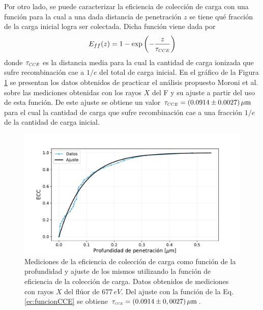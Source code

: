 Por otro lado, se puede caracterizar la eficiencia de colección de carga con una función para la cual a una dada distancia de penetración $z$ se tiene qué fracción de la carga inicial logra ser colectada. Dicha función viene dada por
\begin{equation}
    E_{ff}(z) = 1 - 
    \exp
    \left(
        -\frac{z}{\tau_{\scaleto{CCE}{4pt}}}
    \right)
        \label{ec:funcionCCE}
\end{equation}
donde $\tau_{\scaleto{CCE}{4pt}}$ es la distancia media para la cual la cantidad de carga ionizada que sufre recombinación cae a $1/e$ del total de carga inicial. En el gráfico de la Figura \ref{fig:EficienciaCC} se presentan los datos obtenidos de practicar el análisis propuesto Moroni et al.\cite{PCC-CCE-interno} sobre las mediciones obtenidas con los rayos $X$ del F y su ajuste a partir del uso de esta función. De este ajuste se obtiene un valor $\tau_{\scaleto{CCE}{4pt}} = (0.0914 \pm 0.0027)\,\si{\mu m} $ para el cual la cantidad de carga que sufre recombinación cae a una fracción $1/e$ de la cantidad de carga inicial.
\begin{figure}[h]
    \centering
        \includegraphics[scale=0.5]{Figs/CCE_vs_z.pdf}
    \caption{Mediciones de la eficiencia de colección de carga como función de la profundidad y ajuste de los mismos utilizando la función de eficiencia de la colección de carga. Datos obtenidos de mediciones con rayos $X$ del flúor de $677\,\si{eV}$. Del ajuste con la función de la Eq. \ref{ec:funcionCCE} se obtiene $\tau_{\scaleto{CCE}{3pt}} = (0.0914 \pm 0,0027)\,\si{\mu m}$.}
    \label{fig:EficienciaCC}
\end{figure}
